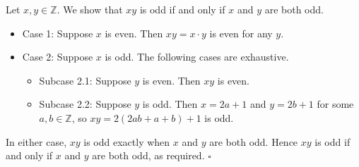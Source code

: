 Let $x, y \in \mathbb{Z}$.
We show that $xy$ is odd if and only if $x$ and $y$ are both odd.

\begin{itemize}
  \item Case 1: Suppose $x$ is even.
    Then $xy = x \cdot y$ is even for any $y$.
  \item Case 2: Suppose $x$ is odd.
    The following cases are exhaustive.
    \begin{itemize}
      \item Subcase 2.1: Suppose $y$ is even.
        Then $xy$ is even.
      \item Subcase 2.2: Suppose $y$ is odd.
        Then $x = 2a + 1$ and $y = 2b + 1$ for some $a, b \in \mathbb{Z}$, so $xy = 2(2ab + a + b) + 1$ is odd.
    \end{itemize}
\end{itemize}

In either case, $xy$ is odd exactly when $x$ and $y$ are both odd.
Hence $xy$ is odd if and only if $x$ and $y$ are both odd, as required. \hfill$\square$